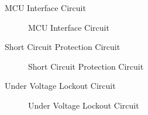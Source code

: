 \begin{frame}{MCU Interface Circuit}
	\begin{figure}
		\centering


		\caption{MCU Interface Circuit}
	\end{figure}
\end{frame}



\begin{frame}{Short Circuit Protection Circuit}
	\begin{figure}
		\centering


		\caption{Short Circuit Protection Circuit}
	\end{figure}
\end{frame}




\begin{frame}{Under Voltage Lockout Circuit}
	\begin{figure}
		\centering


		\caption{Under Voltage Lockout Circuit}
	\end{figure}
\end{frame}


